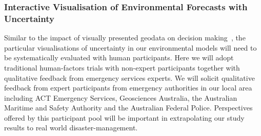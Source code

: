\subsubsection*{Interactive Visualisation of Environmental Forecasts with Uncertainty}

Similar to the impact of visually presented geodata on decision
making~\parencite{kinkeldey2015evaluating}, the particular
visualisations of uncertainty in our environmental models will need to
be systematically evaluated with human participants. Here we will
adopt traditional human-factors trials with non-expert participants
together with qualitative feedback from emergency services experts. We
will solicit qualitative feedback from expert participants from
emergency authorities in our local area including ACT Emergency
Services, Geosciences Australia, the Australian Maritime and Safety
Authority and the Australian Federal Police. Perspectives offered by
this participant pool will be important in extrapolating our study
results to real world disaster-management.

